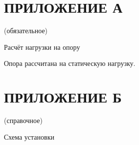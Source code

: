 \newpage
\section*{ПРИЛОЖЕНИЕ А}

(обязательное)

Расчёт нагрузки на опору

Опора рассчитана на статическую нагрузку.

\newpage
\section*{ПРИЛОЖЕНИЕ Б}

(справочное)

Схема установки
